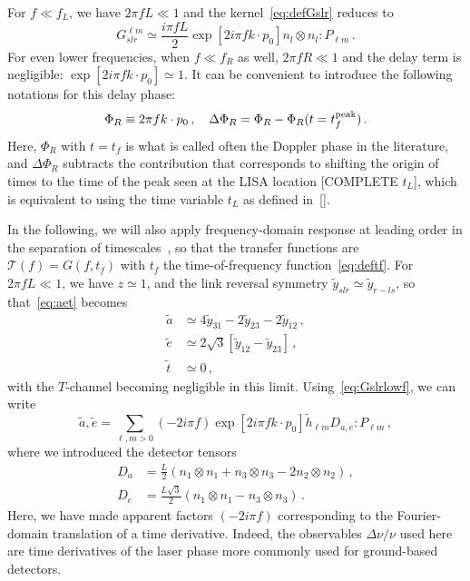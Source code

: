 \documentclass[aps,showpacs,twocolumn,prd,superscriptaddress,nofootinbib]{revtex4-1}
\newcommand{\be}{\begin{equation}}
\newcommand{\ee}{\end{equation}}
\newcommand{\bsub}{\begin{subequations}}
\newcommand{\esub}{\end{subequations}}
\newcommand\calT{{\mathcal{T}}}
\newcommand{\tf}{t_{f}}
\newcommand{\SM}[1]{{\color{Blue} #1}}
\begin{document}
For $f \ll f_{L}$, we have $2\pi f L \ll 1$ and the kernel~\eqref{eq:defGslr} reduces to
\be\label{eq:Gslrlowf}
	G^{\ell m}_{slr} \simeq \frac{i \pi f L}{2} \exp\left[ 2 i \pi f k\cdot p_{0} \right] n_{l} \otimes n_{l} : P_{\ell m}\,.
\ee
For even lower frequencies, when $f \ll f_{R}$ as well, $2\pi f R \ll 1$ and the delay term is negligible: $\exp\left[ 2 i \pi f k\cdot p_{0} \right] \simeq 1$. It can be convenient to introduce the following notations for this delay phase:
\be\label{eq:defPhiR}
	\Phi_{R} \equiv 2 \pi f k\cdot p_{0} \,, \quad \Delta \Phi_{R} = \Phi_{R} - \Phi_{R}(t=t_{f}^{\rm peak}) \,.
\ee
Here, $\Phi_{R}$ with $t=t_{f}$ is what is called often the Doppler phase in the literature, and $\Delta \Phi_{R}$ subtracts the contribution that corresponds to shifting the origin of times to the time of the peak seen at the LISA location \SM{[COMPLETE $t_{L}$]}, which is equivalent to using the time variable $t_{L}$ as defined in~\eqref{}.

In the following, we will also apply frequency-domain response at leading order in the separation of timescales~\cite{MB18}, so that the transfer functions are $\calT(f) = G(f, \tf)$ with $\tf$ the time-of-frequency function~\eqref{eq:deftf}. For $2\pi f L \ll 1$, we have $z\simeq 1$, and the link reversal symmetry $\tilde{y}_{slr} \simeq \tilde{y}_{r-ls}$, so that~\eqref{eq:aet} becomes
\bsub\label{eq:aetlowf}
\begin{align}
	\tilde{a} &\simeq 4\tilde{y}_{31} - 2 \tilde{y}_{23} - 2 \tilde{y}_{12} \,,\\
	\tilde{e} &\simeq 2\sqrt{3} \left[ \tilde{y}_{12}  - \tilde{y}_{23} \right] \,,\\
	\tilde{t} &\simeq 0 \,,
\end{align}
\esub
with the $T$-channel becoming negligible in this limit. Using~\eqref{eq:Gslrlowf}, we can write
\be\label{eq:aelowfmodes}
	\tilde{a}, \tilde{e} = \sum_{\ell, m>0} (-2i\pi f) \exp\left[ 2 i \pi f k\cdot p_{0} \right] \tilde{h}_{\ell m} D_{a,e} : P_{\ell m} \,,
\ee
where we introduced the detector tensors
\bsub\label{eq:DaDe}
\begin{align}
	D_{a} &= \frac{L}{2} \left( n_{1}\otimes n_{1} + n_{3} \otimes n_{3} - 2 n_{2} \otimes n_{2} \right) \,,\\
	D_{e} &= \frac{L\sqrt{3}}{2} \left( n_{1} \otimes n_{1} - n_{3} \otimes n_{3} \right) \,.
\end{align}
\esub
Here, we have made apparent factors $(-2i\pi f)$ corresponding to the Fourier-domain translation of a time derivative. Indeed, the observables $\Delta \nu / \nu$ used here are time derivatives of the laser phase more commonly used for ground-based detectors.
\end{document}
